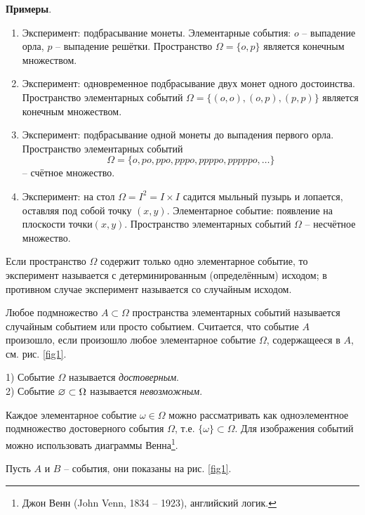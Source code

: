 \textbf{Примеры}. 
\begin{enumerate}
	\item Эксперимент: подбрасывание монеты. Элементарные события: $o$ -- выпадение орла, $p$ -- выпадение решётки. Пространство $\Omega=\{o,p\}$ является конечным множеством.
	\item Эксперимент: одновременное подбрасывание двух монет одного достоинства. Пространство элементарных событий $\Omega=\{(o,o),(o,p),(p,p)\}$ является конечным множеством.
	\item Эксперимент: подбрасывание одной монеты до выпадения первого орла. Пространство элементарных событий $$\Omega=\{o, po, ppo, pppo, ppppo, pppppo, \ldots\}$$ -- счётное множество.
	\item Эксперимент: на стол $\Omega=I^2=I\times I$ садится мыльный пузырь и лопается, оставляя под собой точку $(x, y)$. Элементарное событие: появление на плоскости точки$ (x, y)$. Пространство элементарных событий $\Omega$ -- несчётное
множество.
\end{enumerate}


\begin{definition}
	\label{def:2.3}
Если пространство $\Omega$ содержит только одно элементарное событие, то эксперимент называется с детерминированным (определённым) исходом; в противном случае эксперимент называется со случайным исходом.
\end{definition}

\begin{definition} 
	\label{def:2.4}
Любое подмножество $A\subset\Omega$ пространства элементарных событий называется случайным событием или просто событием. Считается, что событие $A$ произошло, если произошло любое элементарное событие $\Omega$, содержащееся в $A$, см. рис. \ref{fig1}.
\end{definition}

\begin{definition}
	\label{def:2.5}
	1) Событие $\Omega$ называется \textit{достоверным}.\\
	2) Событие $\varnothing\subset\Omega$ называется \textit{невозможным}.
\end{definition}

Каждое элементарное событие $\omega\in\Omega$ можно рассматривать как одноэлементное подмножество достоверного события $\Omega$, т.е. $\{\omega\}\subset\Omega$. Для изображения событий можно использовать диаграммы Венна\footnote{Джон Венн (John Venn, 1834 -- 1923), английский логик.}.

Пусть $A$ и $B$ -- события, они показаны на рис. \ref{fig1}.

